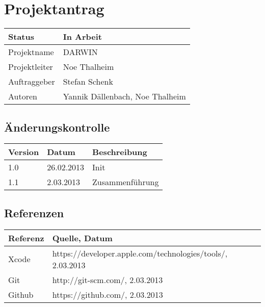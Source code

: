 \documentclass{scrartcl}
\begin{document}
	\section*{Projektantrag}
	
	\begin{tabularx}{\textwidth}{| X | X |}
	\hline
	Status & In Arbeit\\
	\hline
	Projektname & DARWIN\\
	\hline
	Projektleiter & Noe Thalheim\\
	\hline
	Auftraggeber & Stefan Schenk\\
	\hline
	Autoren & Yannik Dällenbach, Noe Thalheim\\
	\hline
	\end{tabularx}
	
	\subsection*{Änderungskontrolle}
	\begin{tabularx}{\textwidth}{| X | X | X |}
	\hline
	\rowcolor[gray]{0.9} Version & Datum & Beschreibung\\
	\hline
	1.0 & 26.02.2013 & Init\\
	\hline
	1.1 & 2.03.2013 & Zusammenführung\\
	\hline
	\end{tabularx}

	\subsection*{Referenzen}
	
	\begin{tabular}{| l | l | }
	\hline
	\rowcolor[gray]{0.9} Referenz & Quelle, Datum\\
	\hline
	 Xcode & https://developer.apple.com/technologies/tools/, 2.03.2013\\
	 \hline
 	 Git & http://git-scm.com/, 2.03.2013\\
	 \hline
	 Github & https://github.com/, 2.03.2013\\
	 \hline
	\end{tabular}
	
	\pagebreak
	\tableofcontents
	\pagebreak
	
	
	
	
	
	
	
	
	
	
	
\end{document}
